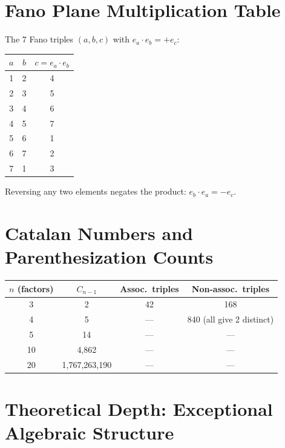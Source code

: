 \documentclass{article}
\begin{document}
\appendix

\section{Fano Plane Multiplication Table}
\label{app:fano}

The 7 Fano triples $(a,b,c)$ with $e_a \cdot e_b = +e_c$:
\begin{center}
\begin{tabular}{@{}ccc@{}}
\toprule
$a$ & $b$ & $c = e_a \cdot e_b$ \\
\midrule
1 & 2 & 4 \\
2 & 3 & 5 \\
3 & 4 & 6 \\
4 & 5 & 7 \\
5 & 6 & 1 \\
6 & 7 & 2 \\
7 & 1 & 3 \\
\bottomrule
\end{tabular}
\end{center}

Reversing any two elements negates the product: $e_b \cdot e_a = -e_c$.

\section{Catalan Numbers and Parenthesization Counts}
\label{app:catalan}

\begin{center}
\begin{tabular}{@{}cccc@{}}
\toprule
$n$ (factors) & $C_{n-1}$ & Assoc.~triples & Non-assoc.~triples \\
\midrule
3 & 2 & 42 & 168 \\
4 & 5 & --- & 840 (all give 2 distinct) \\
5 & 14 & --- & --- \\
10 & 4,862 & --- & --- \\
20 & 1,767,263,190 & --- & --- \\
\bottomrule
\end{tabular}
\end{center}

\section{Theoretical Depth: Exceptional Algebraic Structure}
\label{app:depth}
\end{document}
